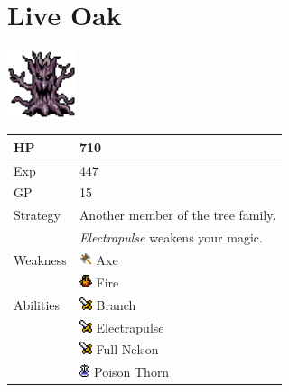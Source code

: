 \section{Live Oak}
\label{monster:live_oak}

\includegraphics[height=2cm,keepaspectratio]{./resources/monster/live_oak}

\begin{longtable}{ l p{9cm} }
	HP
	& 710
\\ \hline
	Exp
	& 447
\\ \hline
	GP
	& 15
\\ \hline
	Strategy
	& Another member of the tree family. \\
	& \textit{Electrapulse} weakens your magic.
\\ \hline
	Weakness
	& \includegraphics[height=1em,keepaspectratio]{./resources/effects/axe} Axe \\
	& \includegraphics[height=1em,keepaspectratio]{./resources/effects/fire} Fire
\\ \hline
	Abilities
	& \includegraphics[height=1em,keepaspectratio]{./resources/effects/damage} Branch \\
	& \includegraphics[height=1em,keepaspectratio]{./resources/effects/damage} Electrapulse \\
	& \includegraphics[height=1em,keepaspectratio]{./resources/effects/damage} Full Nelson \\
	& \includegraphics[height=1em,keepaspectratio]{./resources/effects/poison} Poison Thorn
\end{longtable}
